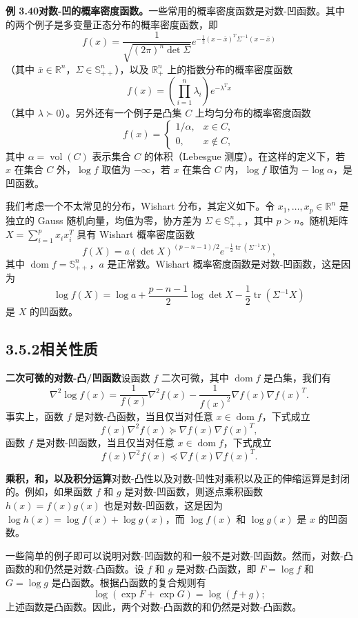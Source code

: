 \documentclass[UTF8,12pt,a4paper,fontset=fandol]{ctexart}
\DeclareMathOperator{\dom}{dom}
\begin{document}
\noindent\textbf{例 3.40\quad 对数-凹的概率密度函数。}\quad 一些常用的概率密度函数是对数-凹函数。其中的两个例子是多变量正态分布的概率密度函数，即
\[
f(x)=\frac{1}{\sqrt{(2\pi)^n\det\Sigma}}
e^{-\frac{1}{2}(x-\bar x)^T\Sigma^{-1}(x-\bar x)}
\]
（其中 $\bar x\in\mathbb{R}^n$，$\Sigma\in\mathbb{S}_{++}^n$），以及 $\mathbb{R}_+^n$ 上的指数分布的概率密度函数
\[
f(x)=\left(\prod_{i=1}^n\lambda_i\right)e^{-\lambda^Tx}
\]
（其中 $\lambda\succ0$）。另外还有一个例子是凸集 $C$ 上均匀分布的概率密度函数
\[
f(x)=
\begin{cases}
1/\alpha, & x\in C,\\
0, & x\notin C,
\end{cases}
\]
其中 $\alpha=\operatorname{vol}(C)$ 表示集合 $C$ 的体积（Lebesgue 测度）。在这样的定义下，若 $x$ 在集合 $C$ 外，$\log f$ 取值为 $-\infty$，若 $x$ 在集合 $C$ 内，$\log f$ 取值为 $-\log\alpha$，是凹函数。

我们考虑一个不太常见的分布，Wishart 分布，其定义如下。令 $x_1,\ldots,x_p\in\mathbb{R}^n$ 是独立的 Gauss 随机向量，均值为零，协方差为 $\Sigma\in\mathbb{S}_{++}^n$，其中 $p>n$。随机矩阵 $X=\sum_{i=1}^p x_ix_i^T$ 具有 Wishart 概率密度函数
\[
f(X)=a(\det X)^{(p-n-1)/2}e^{-\frac{1}{2}\operatorname{tr}(\Sigma^{-1}X)},
\]
其中 $\dom f=\mathbb{S}_{++}^n$，$a$ 是正常数。Wishart 概率密度函数是对数-凹函数，这是因为
\[
\log f(X)=\log a+\frac{p-n-1}{2}\log\det X-\frac{1}{2}\operatorname{tr}(\Sigma^{-1}X)
\]
是 $X$ 的凹函数。

\subsection*{3.5.2\quad 相关性质}

\noindent\textbf{二次可微的对数-凸/凹函数}\quad 设函数 $f$ 二次可微，其中 $\dom f$ 是凸集，我们有
\[
\nabla^2\log f(x)=\frac{1}{f(x)}\nabla^2 f(x)-\frac{1}{f(x)^2}\nabla f(x)\nabla f(x)^T.
\]
事实上，函数 $f$ 是对数-凸函数，当且仅当对任意 $x\in\dom f$，下式成立
\[
f(x)\nabla^2 f(x)\succeq\nabla f(x)\nabla f(x)^T,
\]
函数 $f$ 是对数-凹函数，当且仅当对任意 $x\in\dom f$，下式成立
\[
f(x)\nabla^2 f(x)\preceq\nabla f(x)\nabla f(x)^T.
\]

\noindent\textbf{乘积，和，以及积分运算}\quad 对数-凸性以及对数-凹性对乘积以及正的伸缩运算是封闭的。例如，如果函数 $f$ 和 $g$ 是对数-凹函数，则逐点乘积函数 $h(x)=f(x)g(x)$ 也是对数-凹函数，这是因为 $\log h(x)=\log f(x)+\log g(x)$，而 $\log f(x)$ 和 $\log g(x)$ 是 $x$ 的凹函数。

一些简单的例子即可以说明对数-凹函数的和一般不是对数-凹函数。然而，对数-凸函数的和仍然是对数-凸函数。设 $f$ 和 $g$ 是对数-凸函数，即 $F=\log f$ 和 $G=\log g$ 是凸函数。根据凸函数的复合规则有
\[
\log(\exp F+\exp G)=\log(f+g);
\]
上述函数是凸函数。因此，两个对数-凸函数的和仍然是对数-凸函数。
\end{document}
